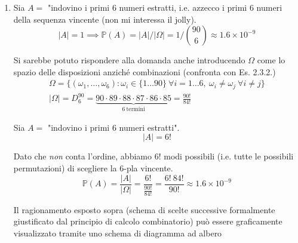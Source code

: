 \begin{enumerate}
\item Sia $A=$ "indovino i primi $6$ numeri estratti, i.e. azzecco i primi $6$ numeri della sequenza vincente (non mi interessa il jolly).\begin{equation*}
| A| =1\mathbb{\implies P}( A) =| A| /| \Omega | =1/\binom{90}{6} \approx 1.6\times 10^{-9}
\end{equation*}

\begin{oss}
Si sarebbe potuto rispondere alla domanda anche introducendo $\Omega $ come lo spazio delle disposizioni anziché combinazioni (confronta con Es. 2.3.2.)\begin{gather*}
\Omega =\{( \omega _{1} ,\dotsc ,\omega _{6}) :\omega _{i} \in \{1\dotsc 90\} \ \forall i=1\dotsc 6,\ \omega _{i} \neq \omega _{j} \ \forall i\neq j\}\\
| \Omega | =D_{6}^{90} =\underbrace{90\cdot 89\cdot 88\cdot 87\cdot 86\cdot 85}_{6\ \text{termini}} =\frac{90!}{84!}
\end{gather*}
\end{oss}

Sia $A=$ "indovino i primi $6$ numeri estratti".\begin{equation*}
| A| =6!
\end{equation*}

Dato che \textit{non} conta l'ordine, abbiamo $6!$ modi possibili (i.e. tutte le possibili permutazioni) di scegliere la $6$-pla vincente.\begin{equation*}
\mathbb{P}( A) =\frac{| A| }{| \Omega | } =\frac{6!}{\frac{90!}{84!}} =\frac{6!\ 84!}{90!} \approx 1.6\times 10^{-9}
\end{equation*}

Il ragionamento esposto sopra (schema di scelte successive formalmente giustificato dal principio di calcolo combinatorio) può essere graficamente visualizzato tramite uno schema di diagramma ad albero


\begin{tikzpicture}[x=0.75pt,y=0.75pt,yscale=-1,xscale=1]


\end{tikzpicture}
\end{enumerate}
